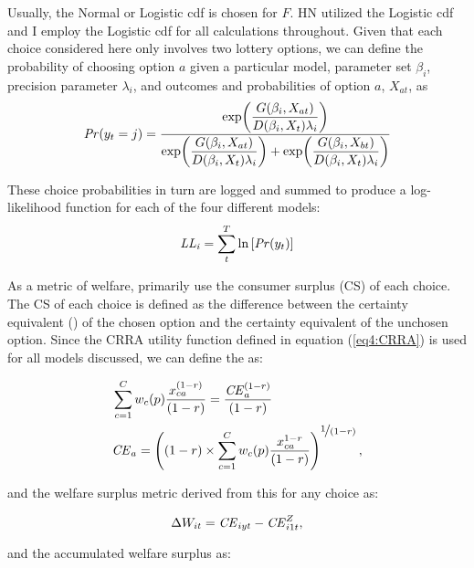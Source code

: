 \documentclass[../main.tex]{subfiles}
\begin{document}
Usually, the Normal or Logistic cdf is chosen for $F$.
HN utilized the Logistic cdf and I employ the Logistic cdf for all calculations throughout.
Given that each choice considered here only involves two lottery options, we can define the probability of choosing option $a$ given a particular model, parameter set $\beta_i$, precision parameter $\lambda_i$, and outcomes and probabilities of option $a$, $X_{at}$, as
\begin{equation}
	\label{eq4:RE.f}
	{\ensuremath{\mathit{Pr}}}(y_t=j) =\dfrac{\exp\!\left( \dfrac{ G(\beta_i,X_{at}) }{ D(\beta_i,X_{t})\lambda_i }  \right)}{  \exp\!\left( \dfrac{ G(\beta_i,X_{at}) }{ D(\beta_i,X_{t})\lambda_i }  \right) + \exp\!\left( \dfrac{ G(\beta_i,X_{bt}) }{ D(\beta_i,X_{t})\lambda_i }  \right)    }
\end{equation}

\noindent These choice probabilities in turn are logged and summed to produce a log-likelihood function for each of the four different models:
\begin{equation}
	\label{eq4:ll}
	\mathit{LL_i} = \sum_{t}^T \ln \left[ {\mathit{Pr}}(y_t) \right]
\end{equation}

As a metric of welfare, \textcite{Harrison2016} primarily use the consumer surplus (CS) of each choice.
The CS of each choice is defined as the difference between the certainty equivalent ({\CE}) of the chosen option and the certainty equivalent of the unchosen option.
Since the CRRA utility function defined in equation (\ref{eq4:CRRA}) is used for all models discussed, we can define the {\CE} as:

\begin{align}
	\label{eq4:CEcalc}
	\begin{split}
		&\sum_{c=1}^{C} w_c(p) \frac{x_{ca}^{(1-r)}}{(1-r)} = \frac{ {\mathit{CE}}_a^{(1-r)}}{(1-r)}\\
		&{\mathit{CE}}_a =  \left( (1-r) \times \sum_{c=1}^{C} w_c(p) \frac{x_{ca}^{1-r}}{(1-r)} \right)^{ \displaystyle\nicefrac{1}{(1-r)} } ,
	\end{split}
\end{align}

\noindent and the welfare surplus metric derived from this {\CE} for any choice as:

\begin{equation}
	\label{eq4:wsurplus}
	\Delta W_{it} =  {\mathit{CE}}_{iyt} - {\mathit{CE}}_{i1t}^Z ,
\end{equation}

\noindent and the accumulated welfare surplus as:
\end{document}
